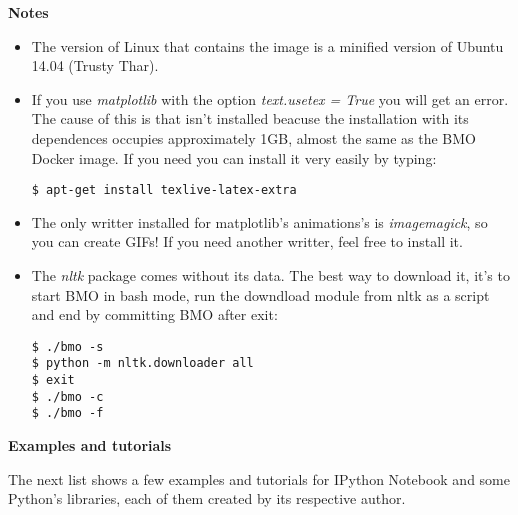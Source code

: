 \Large
\textbf{Notes}

\normalsize
\begin{itemize}
\item[\textbullet]The version of Linux that contains the image is a minified version of Ubuntu 14.04 (Trusty Thar).

\item[\textbullet]If you use \emph{matplotlib} with the option \emph{text.usetex = True} you will get an error. The cause of this is that  isn't installed beacuse the installation with its dependences occupies approximately 1GB, almost the same as the BMO Docker image. If you need  you can install it very easily by typing:

\vspace*{3mm}
\begin{lstlisting}
$ apt-get install texlive-latex-extra
\end{lstlisting}

\item[\textbullet]The only writter installed for matplotlib's animations's is \emph{imagemagick}, so you can create GIFs! If you need another writter, feel free to install it.

\item[\textbullet]The \emph{nltk} package comes without its data. The best way to download it, it's to start BMO in bash mode, run the downdload module from nltk as a script and end by committing BMO after exit:

\vspace*{3mm}
\begin{lstlisting}
$ ./bmo -s
$ python -m nltk.downloader all
$ exit
$ ./bmo -c
$ ./bmo -f
\end{lstlisting}
\end{itemize}

\Large
\textbf{Examples and tutorials}

\normalsize
The next list shows a few examples and tutorials for IPython Notebook and some Python's libraries, each of them created by its respective author.

